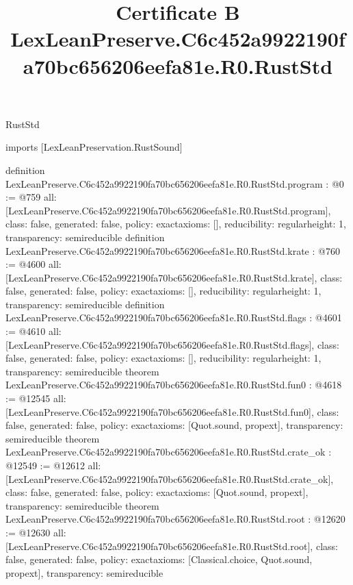 \begin{lexlean}{RustStd}
\title{Certificate B LexLeanPreserve.C6c452a9922190fa70bc656206eefa81e.R0.RustStd}
\begin{coremodule}
imports [LexLeanPreservation.RustSound]

definition LexLeanPreserve.C6c452a9922190fa70bc656206eefa81e.R0.RustStd.program : @0 := @759 {
  all: [LexLeanPreserve.C6c452a9922190fa70bc656206eefa81e.R0.RustStd.program],
  class: false,
  generated: false,
  policy: exact{axioms: []},
  reducibility: regular{height: 1},
  transparency: semireducible
}
definition LexLeanPreserve.C6c452a9922190fa70bc656206eefa81e.R0.RustStd.krate : @760 := @4600 {
  all: [LexLeanPreserve.C6c452a9922190fa70bc656206eefa81e.R0.RustStd.krate],
  class: false,
  generated: false,
  policy: exact{axioms: []},
  reducibility: regular{height: 1},
  transparency: semireducible
}
definition LexLeanPreserve.C6c452a9922190fa70bc656206eefa81e.R0.RustStd.flags : @4601 := @4610 {
  all: [LexLeanPreserve.C6c452a9922190fa70bc656206eefa81e.R0.RustStd.flags],
  class: false,
  generated: false,
  policy: exact{axioms: []},
  reducibility: regular{height: 1},
  transparency: semireducible
}
theorem LexLeanPreserve.C6c452a9922190fa70bc656206eefa81e.R0.RustStd.fun0 : @4618 := @12545 {
  all: [LexLeanPreserve.C6c452a9922190fa70bc656206eefa81e.R0.RustStd.fun0],
  class: false,
  generated: false,
  policy: exact{axioms: [Quot.sound, propext]},
  transparency: semireducible
}
theorem LexLeanPreserve.C6c452a9922190fa70bc656206eefa81e.R0.RustStd.crate_ok : @12549 := @12612 {
  all: [LexLeanPreserve.C6c452a9922190fa70bc656206eefa81e.R0.RustStd.crate_ok],
  class: false,
  generated: false,
  policy: exact{axioms: [Quot.sound, propext]},
  transparency: semireducible
}
theorem LexLeanPreserve.C6c452a9922190fa70bc656206eefa81e.R0.RustStd.root : @12620 := @12630 {
  all: [LexLeanPreserve.C6c452a9922190fa70bc656206eefa81e.R0.RustStd.root],
  class: false,
  generated: false,
  policy: exact{axioms: [Classical.choice, Quot.sound, propext]},
  transparency: semireducible
}


\end{coremodule}
\end{lexlean}
